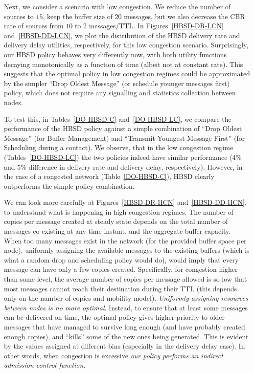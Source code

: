 Next, we consider a scenario with low congestion. We reduce the number of sources to $15$, keep the buffer size of $20$ messages, but we also decrease the CBR rate of sources from
$10$ to $2$ messages/TTL. In Figures~\ref{HBSD-DR-LCN} and~\ref{HBSD-DD-LCN}, we plot the distribution of the HBSD delivery rate and delivery delay utilities, respectively, for this low congestion scenario. Surprisingly, our HBSD policy behaves very differently now, with both utility functions decaying monotonically as a function of time (albeit not at constant rate). This suggests that the optimal policy in low congestion regimes could be approximated by the simpler ``Drop Oldest Message'' (or schedule younger messages first) policy, which does not require any signalling and statistics collection between nodes.

To test this, in Tables~\ref{DO-HBSD-C} and~\ref{DO-HBSD-LC}, we compare the performance of the HBSD policy against a simple combination of ``Drop Oldest Message'' (for Buffer Management) and ``Transmit Youngest Message First'' (for Scheduling during a contact). We observe, that in the low congestion regime (Tables~\ref{DO-HBSD-LC}) the two policies indeed have similar performance (4\% and 5\% difference in delivery rate and delivery delay, respectively). However, in the case of a congested network (Table~\ref{DO-HBSD-C}), HBSD clearly outperforms the simple policy combination.

We can look more carefully at Figures~\ref{HBSD-DR-HCN} and~\ref{HBSD-DD-HCN}, to understand what is happening in high congestion regimes. The number of copies per message created at steady state depends on the total number of messages co-existing at any time instant, and the aggregate buffer capacity. When too many messages exist in the network (for the provided buffer space per node), uniformly assigning the available messages to the existing buffers (which is what a random drop and scheduling policy would do), would imply that every message can have only a few copies created. Specifically, for congestion higher than some level, the average number of copies per message allowed is so low that most messages cannot reach their destination during their TTL (this depends only on the number of copies and mobility model). \emph{Uniformly assigning resources between nodes is no more optimal}. Instead, to ensure that at least some messages can be delivered on time, the optimal policy gives higher priority to older messages that have managed to survive long enough (and have probably created enough copies), and ``kills'' some of the new ones being generated. This is evident by the values assigned at different bins (especially in the delivery delay case). In other words, when congestion is excessive \emph{our policy performs an indirect admission control function.}

